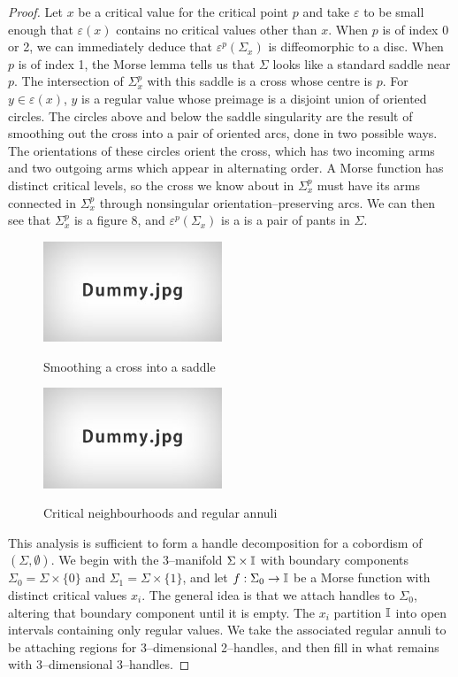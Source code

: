 \begin{proof}
	Let $x$ be a critical value for the critical point $p$ and take $\varepsilon$ to be small enough that $\varepsilon(x)$ contains no critical values other than $x$.
	When $p$ is of index 0 or 2, we can immediately deduce that $\varepsilon^p(\Sigma_x)$ is diffeomorphic to a disc.
	When $p$ is of index 1, the Morse lemma tells us that $\Sigma$ looks like a standard saddle near $p$.
	The intersection of $\Sigma_x^p$ with this saddle is a cross whose centre is $p$.
	For $y\in\varepsilon(x)$, $y$ is a regular value whose preimage is a disjoint union of oriented circles.
	The circles above and below the saddle singularity are the result of smoothing out the cross into a pair of oriented arcs, done in two possible ways.
	The orientations of these circles orient the cross, which has two incoming arms and two outgoing arms which appear in alternating order.
	A Morse function has distinct critical levels, so the cross we know about in $\Sigma_x^p$ must have its arms connected in $\Sigma_x^p$ through nonsingular orientation--preserving arcs.
	We can then see that $\Sigma_x^p$ is a figure 8, and $\varepsilon^p(\Sigma_x)$ is a is a pair of pants in $\Sigma$.
	

	\begin{figure}
		\centering
		\caption{Smoothing a cross into a saddle}
		\includegraphics[height=3cm]{figures/dummy.jpg}
		\label{fig:2dimsteindual}
	\end{figure}	
	
	\begin{figure}
		\centering
		\caption{Critical neighbourhoods and regular annuli}
		\includegraphics[height=3cm]{figures/dummy.jpg}
		\label{fig:2critnbhd}
	\end{figure}
	
	This analysis is sufficient to form a handle decomposition for a cobordism of $(\Sigma,\emptyset)$.
	We begin with the 3--manifold $\Sigma\times\mathbb{I}$ with boundary components $\Sigma_0=\Sigma\times\{0\}$ and $\Sigma_1=\Sigma\times\{1\}$, and let $f:\Sigma_0\to\mathbb{I}$ be a Morse function with distinct critical values $x_i$.
	The general idea is that we attach handles to $\Sigma_0$, altering that boundary component until it is empty.
	The $x_i$ partition $\mathbb{I}$ into open intervals containing only regular values.
	We take the associated regular annuli to be attaching regions for 3--dimensional 2--handles, and then fill in what remains with 3--dimensional 3--handles.
	

\end{proof}

